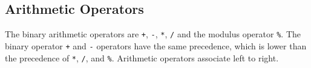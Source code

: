 \subsection{Arithmetic Operators}

The binary arithmetic operators are \texttt{+}, \texttt{-},
\texttt{*}, \texttt{/} and the modulus operator \texttt{\%}.
The binary operator \texttt{+} and \texttt{-} operators have the
same precedence, which is lower than the precedence of \texttt{*},
\texttt{/}, and \texttt{\%}. Arithmetic operators associate left
to right.
